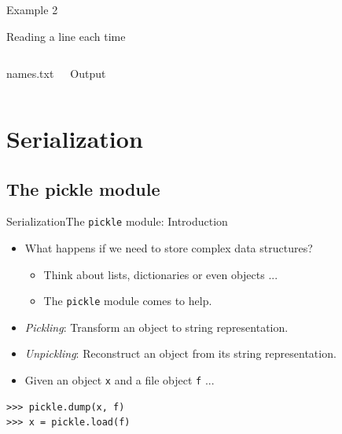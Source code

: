 \documentclass[10pt,compress]{beamer} %
\begin{document}
\begin{frame}[fragile]{Example 2}{}
	\begin{exampleblock}{Reading a line each time}
	\vspace{-0.2cm}
	
	\vspace{-0.2cm}
	\end{exampleblock}

	\begin{columns}
	\begin{exampleblock}{names.txt}
	
	\end{exampleblock}
	\begin{exampleblock}{Output}
	
	\end{exampleblock}
	\end{columns}
	
\end{frame}

\section{Serialization}
\subsection{The pickle module}

\begin{frame}[fragile]{Serialization}{The \texttt{pickle} module: Introduction}
	\begin{itemize}
		\item What happens if we need to store complex data structures?
		\begin{itemize}
			\item Think about lists, dictionaries or even objects ...
			\item The \texttt{pickle} module comes to help.
		\end{itemize}
		\item \textit{Pickling}: Transform an object to string representation.
		\item \textit{Unpickling}: Reconstruct an object from its string representation.
		\item Given an object \texttt{x} and a file object \texttt{f} ...
	\end{itemize}
\begin{verbatim}
>>> pickle.dump(x, f) 
>>> x = pickle.load(f)
\end{verbatim}
\end{frame}
\end{document}
